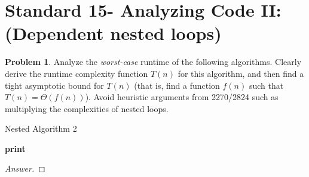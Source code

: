 \documentclass[11pt]{article}
\theoremstyle{definition}
\theoremstyle{definition}
\newtheorem{required}{Problem}
\theoremstyle{definition}
\begin{document}
\newpage
\section{Standard 15- Analyzing Code II: (Dependent nested loops)}
\begin{required}


Analyze the \textit{worst-case} runtime of the following algorithms. Clearly derive the runtime complexity function $T(n)$ for this algorithm, and then find a tight asymptotic bound for $T(n)$ (that is, find a function $f(n)$ such that $T(n) = \Theta(f(n))$). Avoid heuristic arguments from 2270/2824 such as multiplying the complexities of nested loops.


\begin{algorithm}
\caption{Nested Algorithm 2}\label{alg:NestedDependent1}
\begin{algorithmic}[1]
		\State \textbf{print} 
	\EndFor
\EndFor
\EndProcedure
\end{algorithmic}
\end{algorithm}
\end{required}

\begin{proof}[Answer]
\end{proof}
\end{document}
